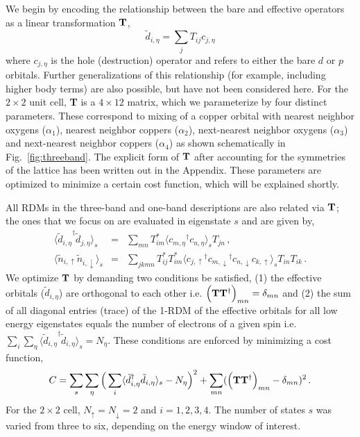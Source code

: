We begin by encoding the relationship between the bare and effective operators as a linear transformation ${\bf T}$, 
\begin{equation}
	\tilde{d}_{i,\eta} = \sum_{j} T_{ij} c_{j,\eta}
\label{eq:dc}
\end{equation}
where $c_{j,\eta}$ is the hole (destruction) operator and refers to either the bare $d$ or $p$ orbitals. 
Further generalizations of this relationship (for example, including higher body terms) are also possible, but have not been considered here. 
For the $2\times2$ unit cell, {\bf T} is a $4 \times 12 $ matrix, which we parameterize by 
four distinct parameters. These correspond to mixing of a copper orbital 
with nearest neighbor oxygens ($\alpha_1$), nearest neighbor coppers ($\alpha_2$), next-nearest neighbor oxygens ($\alpha_3$) 
and next-nearest neighbor coppers ($\alpha_4$) as shown schematically in Fig.~\ref{fig:threeband}. 
The explicit form of ${\bf T}$ after accounting for the symmetries of the 
lattice has been written out in the Appendix. These parameters are optimized to minimize a certain cost function, 
which will be explained shortly. 

All RDMs in the three-band and one-band descriptions are also related via ${\bf T}$; 
the ones that we focus on are evaluated in eigenstate $s$ and are given by,
\begin{subequations}
\begin{eqnarray}
	\langle {\tilde{d}_{i,\eta}}^{\dagger} \tilde{d}_{j,\eta} \rangle_{s} &=& \sum_{mn} T^{*}_{im} \langle {c_{m,\eta}}^{\dagger} c_{n,\eta} \rangle_{s} T_{jn} \label{eq:dmstransformations1} \,,\\
	\langle \tilde{n}_{i,\uparrow} \tilde{n}_{i,\downarrow} \rangle_{s} &=& \sum_{jkmn} T^{*}_{ij} T^{*}_{im} \langle {c_{j,\uparrow}}^{\dagger} {c_{m,\downarrow}}^{\dagger} c_{n,\downarrow} c_{k,\uparrow} \rangle_{s} T_{in} T_{ik}\,.
\label{eq:dmstransformations2}
\end{eqnarray}
\end{subequations}
We optimize ${\bf T}$ by demanding two conditions be satisfied, (1) the effective orbitals ($\tilde{d}_{i,\eta}$) 
are orthogonal to each other i.e. $\Big({\bf T} {\bf T}^{\dagger}\Big)_{mn} = \delta_{mn}$
and (2) the sum of all diagonal entries (trace) of the 1-RDM of the effective orbitals for all low energy eigenstates 
equals the number of electrons of a given spin i.e. $\sum_{i} \sum_{\eta} \langle {\tilde{d}_{i,\eta}}^{\dagger} \tilde{d}_{i,\eta} \rangle_{s} = N_{\eta}$. 
These conditions are enforced by minimizing a cost function,
\begin{equation}
C = \sum_{s} \sum_{\eta} \Big( \sum_{i} \langle \tilde{d}_{i,\eta}^{\dagger} \tilde{d}_{i,\eta} \rangle_{s} - N_{\eta} \Big)^{2} + \sum_{mn} ( \Big({\bf T} {\bf T}^{\dagger}\Big)_{mn} -\delta_{mn})^{2}\,.
\label{eq:C}
\end{equation} 
For the $2\times2$ cell, $N_{\uparrow}=N_{\downarrow}=2$ and $i=1,2,3,4$. 
The number of states $s$ was varied from three to six, depending on the energy window of interest.  


